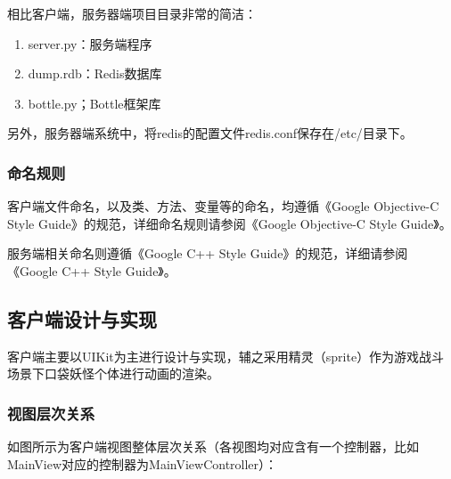 \documentclass{article}
\begin{document}
\begin{CJK}{UTF8}{gbsn}
  相比客户端，服务器端项目目录非常的简洁：
  \begin{enumerate}
    \item server.py：服务端程序
    \item dump.rdb：Redis数据库
		\item bottle.py；Bottle框架库
  \end{enumerate}

  另外，服务器端系统中，将redis的配置文件redis.conf保存在/etc/目录下。

	\subsubsection{命名规则}
  客户端文件命名，以及类、方法、变量等的命名，均遵循《Google Objective-C Style Guide》的规范，详细命名规则请参阅《Google Objective-C Style Guide》\cite{N03}。

  服务端相关命名则遵循《Google C++ Style Guide》的规范，详细请参阅《Google C++ Style Guide》\cite{N04}。

	\subsection{客户端设计与实现}
  客户端主要以UIKit为主进行设计与实现，辅之采用精灵（sprite\cite{B06}）作为游戏战斗场景下口袋妖怪个体进行动画的渲染。

	\subsubsection{视图层次关系}
  如图所示为客户端视图整体层次关系（各视图均对应含有一个控制器，比如MainView对应的控制器为MainViewController）：


\end{CJK}
\end{document}
